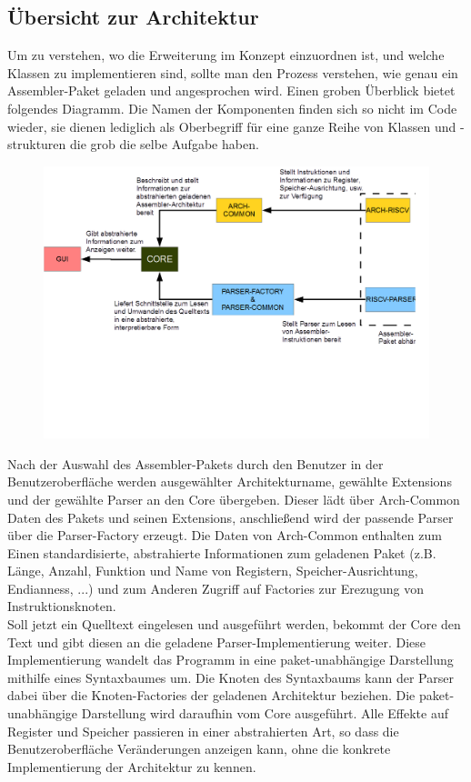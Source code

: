 \subsection{Übersicht zur Architektur}
Um zu verstehen, wo die Erweiterung im Konzept einzuordnen ist, und welche Klassen zu implementieren sind, sollte man den Prozess verstehen, wie genau ein Assembler-Paket geladen und angesprochen wird. Einen groben Überblick bietet folgendes Diagramm. Die Namen der Komponenten finden sich so nicht im Code wieder, sie dienen lediglich als Oberbegriff für eine ganze Reihe von Klassen und -strukturen die grob die selbe Aufgabe haben.
\begin{figure}
	\centering
	\includegraphics[scale=0.5]{charts/extension-overview.png}
	\label{dev-manual-extension-overview}
\end{figure}
Nach der Auswahl des Assembler-Pakets durch den Benutzer in der Benutzeroberfläche werden ausgewählter Architekturname, gewählte Extensions und der gewählte Parser an den Core übergeben. Dieser lädt über Arch-Common Daten des Pakets und seinen Extensions, anschließend wird der passende Parser über die Parser-Factory erzeugt. Die Daten von Arch-Common enthalten zum Einen standardisierte, abstrahierte Informationen zum geladenen Paket (z.B. Länge, Anzahl, Funktion und Name von Registern, Speicher-Ausrichtung, Endianness, ...) und zum Anderen Zugriff auf Factories zur Erezugung von Instruktionsknoten.\\
Soll jetzt ein Quelltext eingelesen und ausgeführt werden, bekommt der Core den Text und gibt diesen an die geladene Parser-Implementierung weiter. Diese Implementierung wandelt das Programm in eine paket-unabhängige Darstellung mithilfe eines Syntaxbaumes um. Die Knoten des Syntaxbaums kann der Parser dabei über die Knoten-Factories der geladenen Architektur beziehen. Die paket-unabhängige Darstellung wird daraufhin vom Core ausgeführt. Alle Effekte auf Register und Speicher passieren in einer abstrahierten Art, so dass die Benutzeroberfläche Veränderungen anzeigen kann, ohne die konkrete Implementierung der Architektur zu kennen.\\

